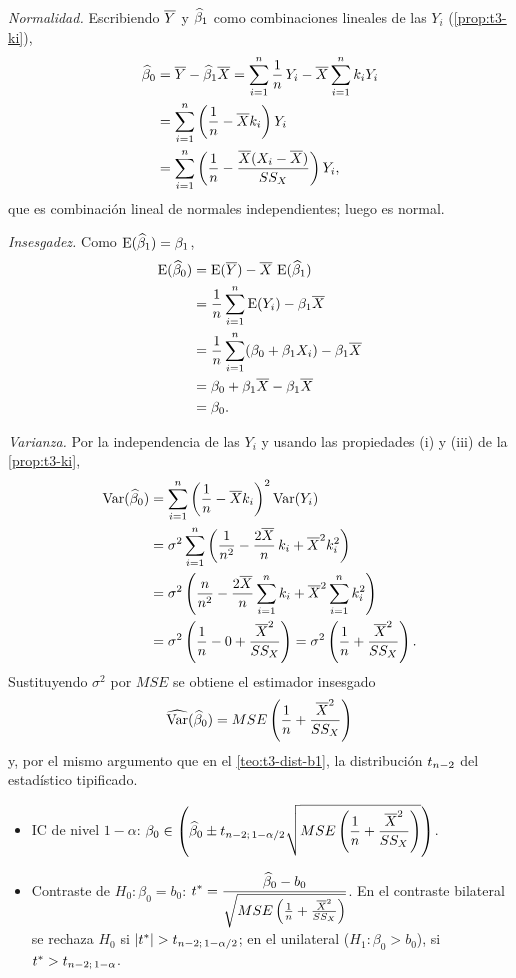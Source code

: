 \begin{demostracion}
  \emph{Normalidad.} Escribiendo $\overline{Y}$ y $\widehat{\beta}_1$ como combinaciones lineales de
  las $Y_i$ (\cref{prop:t3-ki}),
  \begin{align*}
    \widehat{\beta}_0 &= \overline{Y}-\widehat{\beta}_1\overline{X}
      = \sum_{i=1}^{n} \frac1n\,Y_i - \overline{X}\sum_{i=1}^{n} k_iY_i \\
    &= \sum_{i=1}^{n}\left(\frac1n - \overline{X}k_i\right)Y_i \\
    &= \sum_{i=1}^{n}\left(\frac1n - \frac{\overline{X}(X_i-\overline{X})}{SS_X}\right)Y_i ,
  \end{align*}
  que es combinación lineal de normales independientes; luego es normal.

  \emph{Insesgadez.} Como $\operatorname{E}(\widehat{\beta}_1)=\beta_1$,
  \begin{align*}
    \operatorname{E}(\widehat{\beta}_0) &= \operatorname{E}(\overline{Y}) - \overline{X}\,\operatorname{E}(\widehat{\beta}_1) \\
    &= \frac1n\sum_{i=1}^{n}\operatorname{E}(Y_i) - \beta_1\overline{X} \\
    &= \frac1n\sum_{i=1}^{n}(\beta_0+\beta_1X_i) - \beta_1\overline{X} \\
    &= \beta_0 + \beta_1\overline{X} - \beta_1\overline{X} \\
    &= \beta_0 .
  \end{align*}

  \emph{Varianza.} Por la independencia de las $Y_i$ y usando las propiedades (i) y (iii) de
  la \cref{prop:t3-ki},
  \begin{align*}
    \operatorname{Var}(\widehat{\beta}_0) &= \sum_{i=1}^{n}\left(\frac1n-\overline{X}k_i\right)^2\operatorname{Var}(Y_i) \\
    &= \sigma^2\sum_{i=1}^{n}\left(\frac{1}{n^2} - \frac{2\overline{X}}{n}\,k_i + \overline{X}^2k_i^2\right) \\
    &= \sigma^2\left(\frac{n}{n^2} - \frac{2\overline{X}}{n}\sum_{i=1}^{n} k_i
       + \overline{X}^2\sum_{i=1}^{n} k_i^2\right) \\
    &= \sigma^2\left(\frac1n - 0 + \frac{\overline{X}^2}{SS_X}\right)
     = \sigma^2\left(\frac1n + \frac{\overline{X}^2}{SS_X}\right).
  \end{align*}
  Sustituyendo $\sigma^2$ por $MSE$ se obtiene el estimador insesgado
  \[
    \widehat{\operatorname{Var}}(\widehat{\beta}_0)=MSE\left(\frac1n+\frac{\overline{X}^2}{SS_X}\right)
  \]
  y, por el mismo argumento que en el \cref{teo:t3-dist-b1}, la distribución $t_{n-2}$ del
  estadístico tipificado.
\end{demostracion}

\begin{resumen}
  \begin{itemize}
    \item IC de nivel $1-\alpha$:
      $\displaystyle \beta_0 \in \left(\widehat{\beta}_0 \pm t_{n-2;\,1-\alpha/2}
      \sqrt{MSE\left(\frac1n+\frac{\overline{X}^2}{SS_X}\right)}\right)$.
    \item Contraste de $H_0\colon\beta_0=b_0$:
      $\displaystyle t^* = \frac{\widehat{\beta}_0-b_0}{\sqrt{MSE\left(\frac1n+\frac{\overline{X}^2}{SS_X}\right)}}$.
      En el contraste bilateral se rechaza $H_0$ si $|t^*|>\tq{n-2}{1-\alpha/2}$; en el
      unilateral ($H_1\colon\beta_0>b_0$), si $t^*>t_{n-2;\,1-\alpha}$.
  \end{itemize}
\end{resumen}

